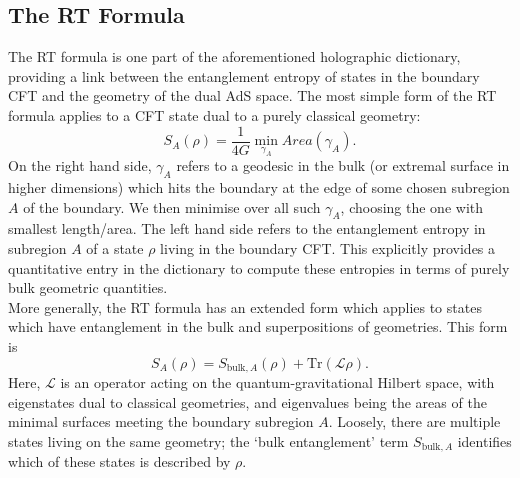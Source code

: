 \documentclass[12pt,a4paper]{report}
\numberwithin{equation}{section}
\newcommand{\tr}{\text{Tr}}
\theoremstyle{definition}
\theoremstyle{theorem}
\theoremstyle{theorem}
\theoremstyle{example}
\theoremstyle{definition}
\begin{document}
\subsection{The RT Formula}
The RT formula is one part of the aforementioned holographic dictionary, providing a link between the entanglement entropy of states in the boundary CFT and the geometry of the dual AdS space. The most simple form of the RT formula applies to a CFT state dual to a purely classical geometry:
\begin{equation}
	S_{A}(\rho)=\frac{1}{4G}\min_{\gamma_{A}}Area(\gamma_{A}).
\end{equation}
On the right hand side, $\gamma_{A}$ refers to a geodesic in the bulk (or extremal surface in higher dimensions) which hits the boundary at the edge of some chosen subregion $A$ of the boundary. We then minimise over all such $\gamma_{A}$, choosing the one with smallest length/area. The left hand side refers to the entanglement entropy in subregion $A$ of a state $\rho$ living in the boundary CFT. This explicitly provides a quantitative entry in the dictionary to compute these entropies in terms of purely bulk geometric quantities.\\
More generally, the RT formula has an extended form which applies to states which have entanglement in the bulk and superpositions of geometries. This form is
\begin{equation}
	S_{A}(\rho)=S_{\text{bulk},A}(\rho)+\tr(\mathcal{L}\rho).
\end{equation}
Here, $\mathcal{L}$ is an operator acting on the quantum-gravitational Hilbert space, with eigenstates dual to classical geometries, and eigenvalues being the areas of the minimal surfaces meeting the boundary subregion $A$. Loosely, there are multiple states living on the same geometry; the `bulk entanglement' term $S_{\text{bulk},A}$ identifies which of these states is described by $\rho$.
\end{document}
